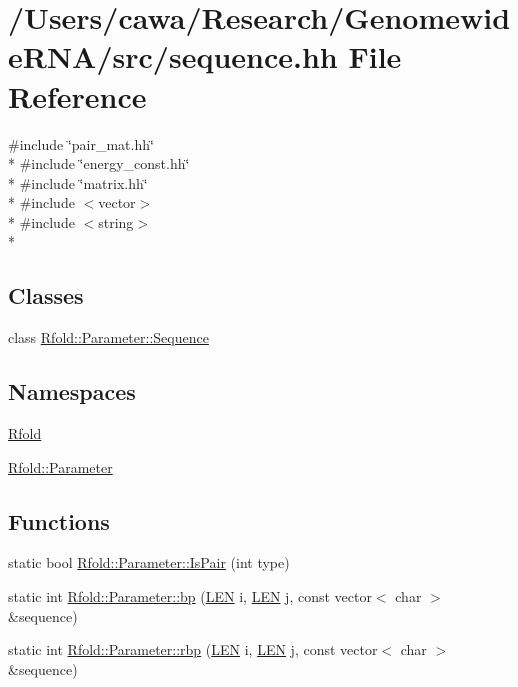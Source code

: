 \hypertarget{sequence_8hh}{\section{/\+Users/cawa/\+Research/\+Genomewide\+R\+N\+A/src/sequence.hh File Reference}
\label{sequence_8hh}
}
{\ttfamily \#include \char`\"{}pair\+\_\+mat.\+hh\char`\"{}}\\*
{\ttfamily \#include \char`\"{}energy\+\_\+const.\+hh\char`\"{}}\\*
{\ttfamily \#include \char`\"{}matrix.\+hh\char`\"{}}\\*
{\ttfamily \#include $<$vector$>$}\\*
{\ttfamily \#include $<$string$>$}\\*
\subsection*{Classes}
\begin{DoxyCompactItemize}
\item 
class \hyperlink{class_rfold_1_1_parameter_1_1_sequence}{Rfold\+::\+Parameter\+::\+Sequence}
\end{DoxyCompactItemize}
\subsection*{Namespaces}
\begin{DoxyCompactItemize}
\item 
 \hyperlink{namespace_rfold}{Rfold}
\item 
 \hyperlink{namespace_rfold_1_1_parameter}{Rfold\+::\+Parameter}
\end{DoxyCompactItemize}
\subsection*{Functions}
\begin{DoxyCompactItemize}
\item 
static bool \hyperlink{namespace_rfold_1_1_parameter_ac79332af130ad1da3bb3bbd6008bca00}{Rfold\+::\+Parameter\+::\+Is\+Pair} (int type)
\item 
static int \hyperlink{namespace_rfold_1_1_parameter_a84c9aba4d96ad6776c066fdc8a05497f}{Rfold\+::\+Parameter\+::bp} (\hyperlink{energy__const_8hh_a05b49c662c073f89e86804f7856622a0}{L\+E\+N} i, \hyperlink{energy__const_8hh_a05b49c662c073f89e86804f7856622a0}{L\+E\+N} j, const vector$<$ char $>$ \&sequence)
\item 
static int \hyperlink{namespace_rfold_1_1_parameter_aec0b5515ac41c13814b1af83a843b408}{Rfold\+::\+Parameter\+::rbp} (\hyperlink{energy__const_8hh_a05b49c662c073f89e86804f7856622a0}{L\+E\+N} i, \hyperlink{energy__const_8hh_a05b49c662c073f89e86804f7856622a0}{L\+E\+N} j, const vector$<$ char $>$ \&sequence)
\end{DoxyCompactItemize}
